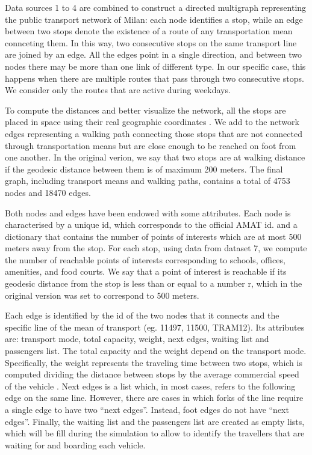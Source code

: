 Data sources 1 to 4 are combined to construct a directed multigraph representing the public transport network of Milan: each node identifies a stop, while an edge between two stops denote the existence of a route of any transportation mean connceting them. In this way, two consecutive stops on the same transport line are joined by an edge. All the edges point in a single direction, and between two nodes there may be more than one link of different type. In our specific case, this happens when there are multiple routes that pass through two consecutive stops. We consider only the routes that are active during weekdays.

To compute the distances and better visualize the network, all the stops are placed in space using their real geographic coordinates \cite{site2,site6}.  
We add to the network edges representing a walking path connecting those stops that are not connected through transportation means but are close enough to be reached on foot from one another. In the original verion, we say that two stops are at walking distance if the geodesic distance between them is of maximum 200 meters. 
The final graph, including transport means and walking paths, contains a total of 4753 nodes and 18470 edges. 

Both nodes and edges have been endowed with some attributes.
Each node is characterised by a unique id, which corresponds to the official AMAT id. and a dictionary that contains the number of points of interests which are at most 500 meters away from the stop. For each stop, using data from dataset 7, we compute the number of reachable points of interests corresponding to schools, offices, amenities, and food courts. We say that a point of interest is reachable if its geodesic distance from the stop is less than or equal to a number r, which in the original version was set to correspond to 500 meters.  
 
Each edge is identified by the id of the two nodes that it connects and the specific line of the mean of transport (eg. 11497, 11500, TRAM12). Its attributes are: transport mode, total capacity, weight, next edges, waiting list and passengers list. The total capacity \cite{site13,site14,site15,site16} and the weight depend on the transport mode. Specifically, the weight represents the traveling time between two stops, which is computed dividing the distance between stops by the average commercial speed of the vehicle \cite{site17}. Next edges is a list which, in most cases, refers to the following edge on the same line. However, there are cases in which forks of the line require a single edge to have two “next edges”. Instead, foot edges do not have “next edges”. Finally, the waiting list and the passengers list are created as empty lists, which will be fill during the simulation to allow to identify the travellers that are waiting for and boarding each vehicle. 


